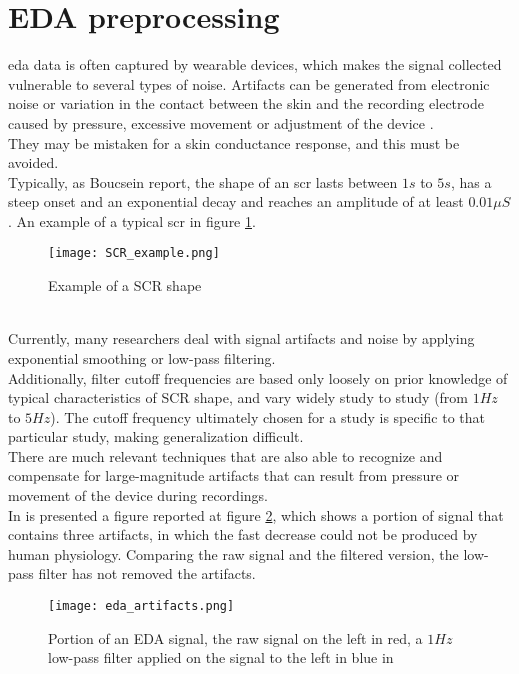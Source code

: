 \section{EDA preprocessing}
\gls{eda} data is often captured by wearable devices, which makes the signal collected vulnerable to several types of noise. Artifacts can be generated from electronic noise or variation in the contact between the skin and the recording electrode caused by pressure, excessive movement or adjustment of the device \cite{taylor2015automatic}.
\\
They may be mistaken for a skin conductance response, and this must be avoided.
\\ \indent
Typically, as Boucsein \cite{boucsein2012electrodermal} report, the shape of an \gls{scr} lasts between $1s$ to $5s$, has a steep onset and an exponential decay and reaches an amplitude of at least $0.01\mu S$. An example of a typical \gls{scr} in figure \ref{fig:SCR_example}.
\begin{figure}[h]
    \centering
    \texttt{[image: SCR\_example.png]} 
	\caption{Example of a SCR shape}
    \label{fig:SCR_example}
\end{figure}
\\
Currently, many researchers deal with signal artifacts and noise by applying exponential smoothing or low-pass filtering.
\\
Additionally, filter cutoff frequencies are based only loosely on prior knowledge of typical characteristics of SCR shape, and vary widely study to study (from $1Hz$ to $5Hz$). The cutoff frequency ultimately chosen for a study is specific to that particular study, making generalization difficult.
\\ \indent
There are much relevant techniques that are also able to recognize and compensate for large-magnitude artifacts that can result from pressure or movement of the device during recordings.
\\
In \cite{taylor2015automatic} is presented a figure reported at figure \ref{fig:eda_artifacts}, which shows a portion of signal that contains three artifacts, in which the fast decrease could not be produced by human physiology. Comparing the raw signal and the filtered version, the low-pass filter has not removed the artifacts.
\begin{figure}[h]
    \centering
    \texttt{[image: eda\_artifacts.png]} 
	\caption{Portion of an EDA signal, the raw signal on the left in red, a $1Hz$ low-pass filter applied on the signal to the left in blue in \cite{taylor2015automatic} }
    \label{fig:eda_artifacts}
\end{figure}
